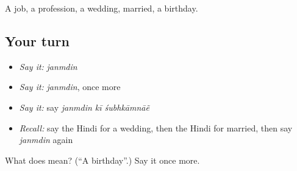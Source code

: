 \begin{grammarlens}[title={What you've built}]
A job, a profession, a wedding, married, a birthday.
\end{grammarlens}

\subsection*{Your turn}
\begin{itemize}
\raggedright
  \item \emph{Say it:} \emph{janmdin}
  \item \emph{Say it:} \emph{janmdin}, once more
  \item \emph{Say it:} say \emph{janmdin kī śubhkāmnāẽ}
  \item \emph{Recall:} say the Hindi for a wedding, then the Hindi for married, then say \emph{janmdin} again
\end{itemize}

\begin{tcolorbox}[breakable,colback=teal!4,colframe=teal!35!black,title={Before you move on}]
What does  mean? (\textquotedblleft{}A birthday\textquotedblright{}.) Say it once more.
\end{tcolorbox}
